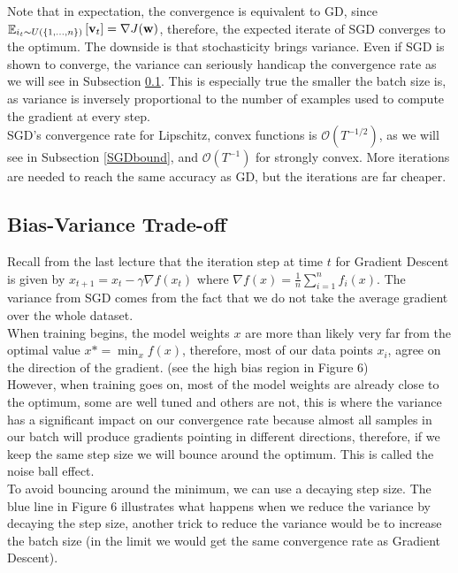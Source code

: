 \documentclass{article}
\begin{document}
Note that in expectation, the convergence is equivalent to GD, since $\mathop{\mathbb{E}}_{i_t \sim U(\{1, ..., n\})} \left [{\bf v}_{t} \right ] = \nabla J({\bf w})$, therefore, the expected iterate of SGD converges to the optimum. The downside is that stochasticity brings variance. Even if SGD is shown to converge, the variance can seriously handicap the convergence rate as we will see in Subsection \ref{BVtradeoff}. This is especially true the smaller the batch size is, as variance is inversely proportional to the number of examples used to compute the gradient at every step.\\

SGD's convergence rate for Lipschitz, convex functions is $\mathcal{O}(T^{-1/2})$, as we will see in Subsection \ref{SGDbound}, and $\mathcal{O}(T^{-1})$ for strongly convex. More iterations are needed to reach the same accuracy as GD, but the iterations are far cheaper.

\subsection{Bias-Variance Trade-off}\label{BVtradeoff}

Recall from the last lecture that the iteration step at time $t$ for Gradient Descent is given by $x_{t+1} = x_{t} - \gamma \nabla f(x_t)$ where $\nabla f(x) = \frac{1}{n}\sum_{i=1}^{n}f_i(x)$. The variance from SGD comes from the fact that we do not take the average gradient over the whole dataset.\\

When training begins, the model weights $x$ are more than likely very far from the optimal value $x*= \min_{x}f(x)$, therefore, most of our data points $x_i$, agree on the direction of the gradient. (see the high bias region in Figure 6)\\

However, when training goes on, most of the model weights are already close to the optimum, some are well tuned and others are not, this is where the variance has a significant impact on our convergence rate because almost all samples in our batch will produce gradients pointing in different directions, therefore, if we keep the same step size we will bounce around the optimum. This is called the noise ball effect.\\

To avoid bouncing around the minimum, we can use a decaying step size. The blue line in Figure 6 illustrates what happens when we reduce the variance by decaying the step size, another trick to reduce the variance would be to increase the batch size (in the limit we would get the same convergence rate as Gradient Descent).
\end{document}
